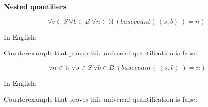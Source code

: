 
{\bf Nested quantifiers}

\[
    \forall s \in S ~\forall b \in B ~\forall n \in \mathbb{N} ~(basecount(~(s,b)~) = n)
\]

In English: \phantom{There exists an ordered $3$-tuple 
at which the predicate $BC$ evaluates to $T$.}

\vspace{30pt}

Counterexample that proves this universal quantification is false:
\phantom{$(\G\G, \G, 3)$ or $(\G\A\U\G, \G, 2)$)}

\vspace{30pt}


\vfill

\[
    ~\forall n \in \mathbb{N} ~\forall s \in S ~\forall b \in B  ~(basecount(~(s,b)~) = n)
\]

In English: \phantom{There exists an ordered $3$-tuple 
at which the predicate $BC$ evaluates to $T$.}

\vspace{30pt}

Counterexample that proves this universal quantification is false:
\phantom{$(\G\G, \G, 3)$ or $(\G\A\U\G, \G, 2)$)}

\vspace{30pt}


\vfill